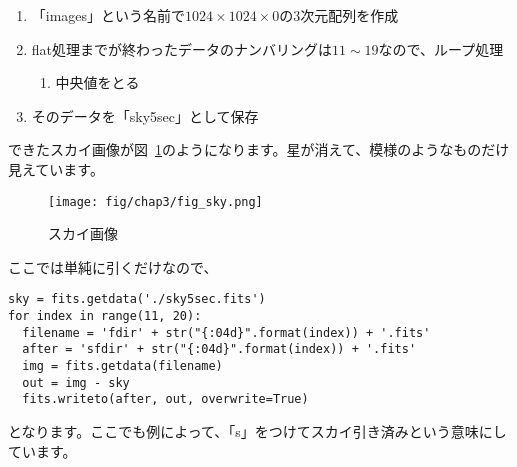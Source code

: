 \begin{enumerate}
  \item 「images」という名前で$1024\times1024\times0$の3次元配列を作成
  \item flat処理までが終わったデータのナンバリングは$11\sim19$なので、ループ処理
  \begin{enumerate}
    \item 中央値をとる
  \end{enumerate}
  \item そのデータを「sky5sec」として保存
\end{enumerate}

できたスカイ画像が図~\ref{fig_3_6}のようになります。星が消えて、模様のようなものだけ見えています。
\begin{figure}
  \centering
  \texttt{[image: fig/chap3/fig\_sky.png]}
  \caption[スカイ画像]{スカイ画像\label{fig_3_6}}
\end{figure}

ここでは単純に引くだけなので、
\begin{lstlisting}[caption=スカイ引き,label=code_3_5_2]
sky = fits.getdata('./sky5sec.fits')
for index in range(11, 20):
  filename = 'fdir' + str("{:04d}".format(index)) + '.fits'
  after = 'sfdir' + str("{:04d}".format(index)) + '.fits'
  img = fits.getdata(filename)
  out = img - sky
  fits.writeto(after, out, overwrite=True)
\end{lstlisting}
となります。ここでも例によって、「s」をつけてスカイ引き済みという意味にしています。

